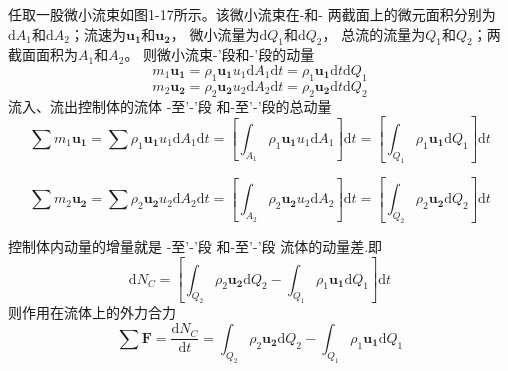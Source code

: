任取一股微小流束如图1-17所示。该微小流束在\uppercase\expandafter{}-\uppercase\expandafter{}和\uppercase\expandafter{}-\uppercase\expandafter{}
两截面上的微元面积分别为$\mathrm{d}A_1$和$\mathrm{d}A_2$；流速为$\boldsymbol {u_1}$和$\boldsymbol {u_2}$，
微小流量为$\mathrm{d}Q_1$和$\mathrm{d}Q_2$，
总流的流量为$Q_1$和$Q_2$；两截面面积为$A_1$和$A_2$。
则微小流束\uppercase\expandafter{}-\uppercase\expandafter{'}段和\uppercase\expandafter{}-\uppercase\expandafter{}'段的动量
\begin{equation*}
  m_1\boldsymbol{u_1}=\rho_1\boldsymbol{u_1}u_1\mathrm{d}A_1\mathrm{d}t=\rho_1\boldsymbol{u_1}\mathrm{d}t\mathrm{d}Q_1
\end{equation*}
\begin{equation*}
  m_2\boldsymbol{u_2}=\rho_2\boldsymbol{u_2}u_2\mathrm{d}A_2\mathrm{d}t=\rho_2\boldsymbol{u_2}\mathrm{d}t\mathrm{d}Q_2
\end{equation*}
流入、流出控制体的流体
\uppercase\expandafter{}-\uppercase\expandafter{}至\uppercase\expandafter{}'-\uppercase\expandafter{}'段
和\uppercase\expandafter{}-\uppercase\expandafter{}至\uppercase\expandafter{}'-\uppercase\expandafter{}'段的总动量
\begin{equation*}
  \sum{m_1\boldsymbol{u_1}}=\sum\rho_1\boldsymbol{u_1}u_1\mathrm{d}A_1\mathrm{d}t=[\int_{A_1}\rho_1\boldsymbol{u_1}u_1\mathrm{d}A_1]\mathrm{d}t=[\int_{Q_1}\rho_1\boldsymbol{u_1}\mathrm{d}Q_1]\mathrm{d}t
\end{equation*}

\begin{equation*}
  \sum{m_2\boldsymbol{u_2}}=\sum\rho_2\boldsymbol{u_2}u_2\mathrm{d}A_2\mathrm{d}t=[\int_{A_2}\rho_2\boldsymbol{u_2}u_2\mathrm{d}A_2]\mathrm{d}t=[\int_{Q_2}\rho_2\boldsymbol{u_2}\mathrm{d}Q_2]\mathrm{d}t
\end{equation*}

控制体内动量的增量就是
\uppercase\expandafter{}-\uppercase\expandafter{}至\uppercase\expandafter{}'-\uppercase\expandafter{}'段
和\uppercase\expandafter{}-\uppercase\expandafter{}至\uppercase\expandafter{}'-\uppercase\expandafter{}'段
流体的动量差.即
\begin{equation*}
  \mathrm{d}N_C=[\int_{Q_2}\rho_2\boldsymbol{u_2}\mathrm{d}Q_2-\int_{Q_1}\rho_1\boldsymbol{u_1}\mathrm{d}Q_1]\mathrm{d}t
\end{equation*} 
则作用在流体上的外力合力
\begin{equation}
\sum \boldsymbol F=\frac{\mathrm{d}N_C}{\mathrm{d}t}=\int_{Q_2}\rho_2\boldsymbol{u_2}\mathrm{d}Q_2-\int_{Q_1}\rho_1\boldsymbol{u_1}\mathrm{d}Q_1
\end{equation} 

